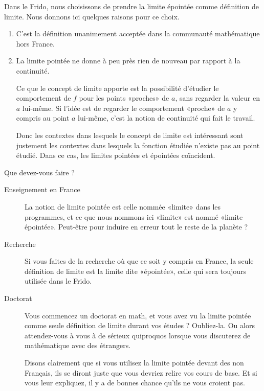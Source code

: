 Dans le Frido, nous choisissons de prendre la limite épointée comme définition de limite. Nous donnons ici quelques raisons pour ce choix.

\begin{enumerate}
    \item
       C'est la définition unanimement acceptée dans la communauté mathématique hors France.
   \item
       La limite pointée ne donne à peu près rien de nouveau par rapport à la continuité.
       
       Ce que le concept de limite apporte est la possibilité d'étudier le comportement de \( f\) pour les points «proches» de \( a\), sans regarder la valeur en \( a\) lui-même. Si l'idée est de regarder le comportement «proche» de \( a\) y compris au point \( a\) lui-même, c'est la notion de continuité qui fait le travail.

       Donc les contextes dans lesquels le concept de limite est intéressant sont justement les contextes dans lesquels la fonction étudiée n'existe pas au point étudié. Dans ce cas, les limites pointées et épointées coïncident.
\end{enumerate}

Que devez-vous faire ?
\begin{description}
    \item[Enseignement en France] La notion de limite pointée est celle nommée «limite» dans les programmes, et ce que nous nommons ici «limite» est nommé «limite épointée». Peut-être pour induire en erreur tout le reste de la planète ?
    \item[Recherche] Si vous faites de la recherche où que ce soit y compris en France, la seule définition de limite est la limite dite «épointée», celle qui sera toujours utilisée dans le Frido.
    \item[Doctorat] Vous commencez un doctorat en math, et vous avez vu la limite pointée comme seule définition de limite durant vos études ? Oubliez-la. Ou alors attendez-vous à vous à de sérieux quiproquos lorsque vous discuterez de mathématique avec des étrangers. 

        Disons clairement que si vous utilisez la limite pointée devant des non Français, ils se diront juste que vous devriez relire vos cours de base. Et si vous leur expliquez, il y a de bonnes chance qu'ils ne vous croient pas.
\end{description}

